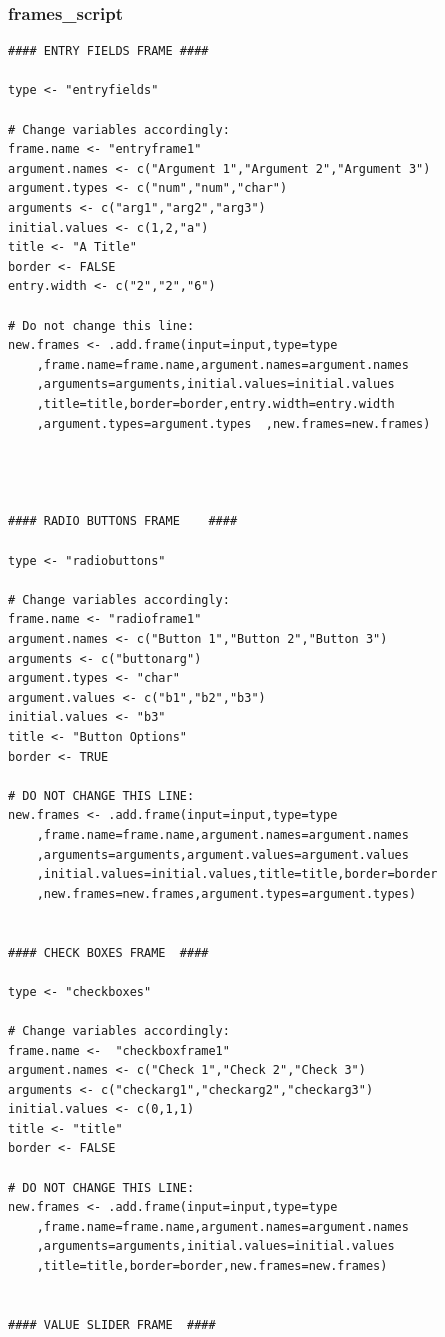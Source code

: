 \documentclass[a4paper]{article}\usepackage[]{graphicx}\usepackage[]{color}
\begin{document}
\subsubsection{frames\_script}
\begin{verbatim}
#### ENTRY FIELDS FRAME ####

type <- "entryfields"

# Change variables accordingly:
frame.name <- "entryframe1"  
argument.names <- c("Argument 1","Argument 2","Argument 3") 
argument.types <- c("num","num","char") 
arguments <- c("arg1","arg2","arg3") 
initial.values <- c(1,2,"a")
title <- "A Title"
border <- FALSE
entry.width <- c("2","2","6")

# Do not change this line:
new.frames <- .add.frame(input=input,type=type
    ,frame.name=frame.name,argument.names=argument.names
    ,arguments=arguments,initial.values=initial.values
    ,title=title,border=border,entry.width=entry.width
    ,argument.types=argument.types  ,new.frames=new.frames)




#### RADIO BUTTONS FRAME 	####

type <- "radiobuttons"

# Change variables accordingly:
frame.name <- "radioframe1"
argument.names <- c("Button 1","Button 2","Button 3")  
arguments <- c("buttonarg")		
argument.types <- "char" 
argument.values <- c("b1","b2","b3") 
initial.values <- "b3"
title <- "Button Options"
border <- TRUE

# DO NOT CHANGE THIS LINE:
new.frames <- .add.frame(input=input,type=type
    ,frame.name=frame.name,argument.names=argument.names
    ,arguments=arguments,argument.values=argument.values
    ,initial.values=initial.values,title=title,border=border
    ,new.frames=new.frames,argument.types=argument.types)	


#### CHECK BOXES FRAME  ####

type <- "checkboxes"

# Change variables accordingly:
frame.name <-  "checkboxframe1"
argument.names <- c("Check 1","Check 2","Check 3")  
arguments <- c("checkarg1","checkarg2","checkarg3") 
initial.values <- c(0,1,1)  
title <- "title"
border <- FALSE

# DO NOT CHANGE THIS LINE:
new.frames <- .add.frame(input=input,type=type
    ,frame.name=frame.name,argument.names=argument.names
    ,arguments=arguments,initial.values=initial.values
    ,title=title,border=border,new.frames=new.frames)


#### VALUE SLIDER FRAME  ####


\end{verbatim}
\end{document}
